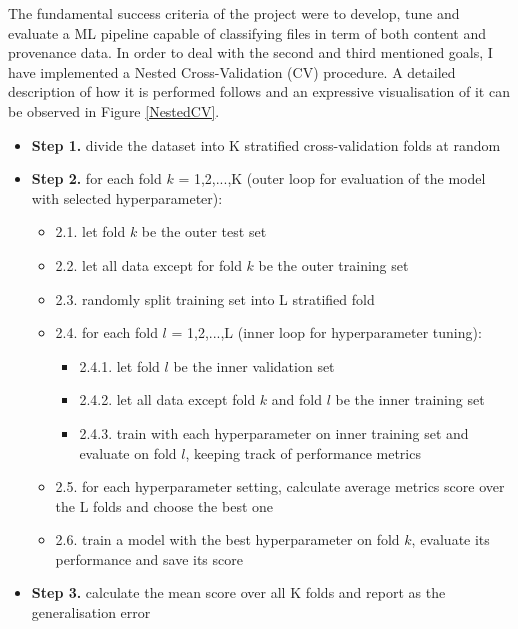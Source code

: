 The fundamental success criteria of the project were to develop, tune and evaluate a ML pipeline capable of classifying files in term of both content and provenance data. In order to deal with the second and third mentioned goals, I have implemented a Nested Cross-Validation (CV) procedure. A detailed description of how it is performed follows and an expressive visualisation of it can be observed in Figure \ref{NestedCV}. \bigskip

\begin{itemize}[label={}]
  \item \textbf{Step 1.} divide the dataset into K stratified cross-validation folds at random
  \item \textbf{Step 2.} for each fold $k$ = 1,2,...,K (outer loop for evaluation of the model with selected hyperparameter):
        \begin{itemize}[label={}]
          \item 2.1. let fold $k$ be the outer test set
          \item 2.2. let all data except for fold $k$ be the outer training set
          \item 2.3. randomly split training set into L stratified fold
          \item 2.4. for each fold $l$ = 1,2,...,L (inner loop for hyperparameter tuning):
                \begin{itemize}[label={}]
                  \item 2.4.1. let fold $l$ be the inner validation set
                  \item 2.4.2. let all data except fold $k$ and fold $l$ be the inner training set
                  \item 2.4.3. train with each hyperparameter on inner training set and evaluate on fold $l$, keeping track of performance metrics
                \end{itemize}
          \item 2.5. for each hyperparameter setting, calculate average metrics score over the L folds and choose the best one
          \item 2.6. train a model with the best hyperparameter on fold $k$, evaluate its performance and save its score
        \end{itemize}
  \item \textbf{Step 3.} calculate the mean score over all K folds and report as the generalisation error
\end{itemize} \bigskip

